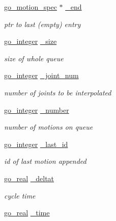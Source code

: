 \begin{DoxyCompactItemize}
\hyperlink{structgomotion_1_1go__motion__spec}{go\-\_\-motion\-\_\-spec} $\ast$ \hyperlink{structgomotion_1_1go__motion__queue_a843d9fbbb3d45019e412efe56e3356a9}{\-\_\-end}
\begin{DoxyCompactList}\small\item\em ptr to last (empty) entry \end{DoxyCompactList}\item 
\hyperlink{gotypes_8h_a7d30f606bb0f58ffe2b3bd71e5c8af5c}{go\-\_\-integer} \hyperlink{structgomotion_1_1go__motion__queue_adc9cde829948ecc241cdcaa5b839c888}{\-\_\-size}
\begin{DoxyCompactList}\small\item\em size of whole queue \end{DoxyCompactList}\item 
\hyperlink{gotypes_8h_a7d30f606bb0f58ffe2b3bd71e5c8af5c}{go\-\_\-integer} \hyperlink{structgomotion_1_1go__motion__queue_ab1ba219a6f370e7df6495ca0fd958108}{\-\_\-joint\-\_\-num}
\begin{DoxyCompactList}\small\item\em number of joints to be interpolated \end{DoxyCompactList}\item 
\hyperlink{gotypes_8h_a7d30f606bb0f58ffe2b3bd71e5c8af5c}{go\-\_\-integer} \hyperlink{structgomotion_1_1go__motion__queue_a1c1fe7f38ef5ba8523d251d2199a19e3}{\-\_\-number}
\begin{DoxyCompactList}\small\item\em number of motions on queue \end{DoxyCompactList}\item 
\hyperlink{gotypes_8h_a7d30f606bb0f58ffe2b3bd71e5c8af5c}{go\-\_\-integer} \hyperlink{structgomotion_1_1go__motion__queue_aeba2a7bb2b6dd7076aed9cc51904f312}{\-\_\-last\-\_\-id}
\begin{DoxyCompactList}\small\item\em id of last motion appended \end{DoxyCompactList}\item 
\hyperlink{gotypes_8h_afd666a2393eebd71ee455846ac9def9b}{go\-\_\-real} \hyperlink{structgomotion_1_1go__motion__queue_a21be21caeb469dc31cae7e4d193f6f63}{\-\_\-deltat}
\begin{DoxyCompactList}\small\item\em cycle time \end{DoxyCompactList}\item 
\hyperlink{gotypes_8h_afd666a2393eebd71ee455846ac9def9b}{go\-\_\-real} \hyperlink{structgomotion_1_1go__motion__queue_a9f72301ca7a9a96fde11f519c097cdaf}{\-\_\-time}

\end{DoxyCompactItemize}
